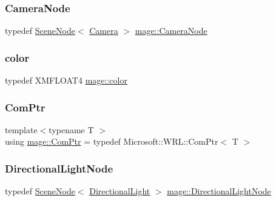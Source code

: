 \hypertarget{namespacemage_a66d89b8744111e4827547a8996fc8ad8}{}\label{namespacemage_a66d89b8744111e4827547a8996fc8ad8} 
\subsubsection{\texorpdfstring{Camera\+Node}{CameraNode}}
{\footnotesize\ttfamily typedef \hyperlink{classmage_1_1_scene_node}{Scene\+Node}$<$ \hyperlink{classmage_1_1_camera}{Camera} $>$ \hyperlink{namespacemage_a66d89b8744111e4827547a8996fc8ad8}{mage\+::\+Camera\+Node}}

\hypertarget{namespacemage_a56eceea5a9bceb2b56073f3ea4945781}{}\label{namespacemage_a56eceea5a9bceb2b56073f3ea4945781} 
\subsubsection{\texorpdfstring{color}{color}}
{\footnotesize\ttfamily typedef X\+M\+F\+L\+O\+A\+T4 \hyperlink{namespacemage_a56eceea5a9bceb2b56073f3ea4945781}{mage\+::color}}

\hypertarget{namespacemage_ae74f374780900893caa5555d1031fd79}{}\label{namespacemage_ae74f374780900893caa5555d1031fd79} 
\subsubsection{\texorpdfstring{Com\+Ptr}{ComPtr}}
{\footnotesize\ttfamily template$<$typename T $>$ \\
using \hyperlink{namespacemage_ae74f374780900893caa5555d1031fd79}{mage\+::\+Com\+Ptr} = typedef Microsoft\+::\+W\+R\+L\+::\+Com\+Ptr$<$ T $>$}

\hypertarget{namespacemage_a5e5cbd16a5bf7ca2b7cdf1b0a37b79b4}{}\label{namespacemage_a5e5cbd16a5bf7ca2b7cdf1b0a37b79b4} 
\subsubsection{\texorpdfstring{Directional\+Light\+Node}{DirectionalLightNode}}
{\footnotesize\ttfamily typedef \hyperlink{classmage_1_1_scene_node}{Scene\+Node}$<$ \hyperlink{classmage_1_1_directional_light}{Directional\+Light} $>$ \hyperlink{namespacemage_a5e5cbd16a5bf7ca2b7cdf1b0a37b79b4}{mage\+::\+Directional\+Light\+Node}}

